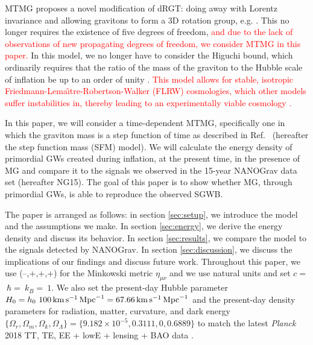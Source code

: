 \documentclass[prd,twocolumn,aps,psfig,nofootinbib,nobibnotes,superscriptaddress,preprintnumbers,times]{revtex4-2}
\def\red{\textcolor{red}}
\newcommand{\s}{\,{\rm s}}
\newcommand{\km}{\,{\rm km}}
\newcommand{\Mpc}{\,{\rm Mpc}}
\begin{document}
MTMG proposes a novel modification of dRGT: doing away with Lorentz invariance and allowing gravitons to form a 3D rotation group, e.g. \cite{Arkani-Hamed:2003pdi, Rubakov:2004eb, Dubovsky:2004sg, Blas:2009my, Rubakov:2008nh, Blas:2007zz, Comelli:2013txa, Langlois:2014jba}. This no longer requires the existence of five degrees of freedom, \red{and due to the lack of observations of new propagating degrees of freedom, we consider MTMG in this paper.} In this model, we no longer have to consider the Higuchi bound, which ordinarily requires that the ratio of the mass of the graviton to the Hubble scale of inflation be up to an order of unity \cite{Higuchi:1986py}. 
\red{This model allows for stable, isotropic Friedmann-Lema\^{\i}tre-Robertson-Walker (FLRW) cosmologies, which other models suffer instabilities in, thereby leading to an experimentally viable cosmology \cite{DeFelice:2015hla}.}

In this paper, we will consider a time-dependent MTMG, specifically one in which the graviton mass is a step function of time as described in Ref.\ \cite{Fujita:2018ehq} (hereafter the step function mass (SFM) model). We will calculate the energy density of primordial GWs created during inflation, at the present time, in the presence of MG and compare it to the signals we observed in the 15-year NANOGrav data set (hereafter NG15). The goal of this paper is to show whether MG, through primordial GWs, is able to reproduce the observed SGWB.

The paper is arranged as follows: in section \ref{sec:setup}, we introduce the model and the assumptions we make. In section \ref{sec:energy}, we derive the energy density and discuss its behavior. In section \ref{sec:results}, we compare the model to the signals detected by NANOGrav. In section \ref{sec:discussion}, we discuss the implications of our findings and discuss future work. Throughout this paper, we use  (--,+,+,+) for the Minkowski metric $\eta_{\mu\nu}$ and we use natural units and set $c = $$\ \hbar = $$\ k_B = $$\ 1$. We also set the present-day Hubble parameter $H_0 = h_0\ 100 \km \s^{-1}\Mpc^{-1} = 67.66 \km \s^{-1}\Mpc^{-1}$ and the present-day density parameters for radiation, matter, curvature, and dark energy $\{\Omega_r, \Omega_m, \Omega_k, \Omega_\Lambda\} = \{9.182\times10^{-5},0.3111,0,0.6889\}$ to match the latest \textit{Planck} 2018 TT, TE, EE + lowE + lensing + BAO data \cite{Planck:2018vyg}.
\end{document}
